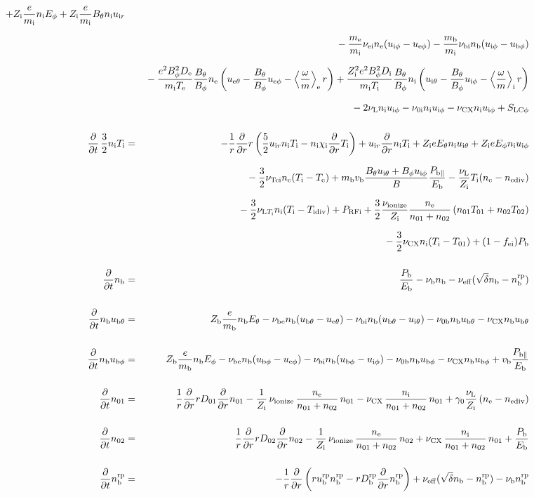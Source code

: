 \documentclass[11pt]{article}
\def\r#1{{\rm#1}}
\def\ddt{\frac{\partial}{\partial t}}
\def\ddr{\frac{\partial}{\partial r}}
\def\ave#1{\left\langle#1\right\rangle}
\def\me{m_\r{e}}
\def\mi{m_\r{i}}
\def\mb{m_\r{b}}
\def\De{D_\r{e}}
\def\Di{D_\r{i}}
\def\chii{\chi_\r{i}}
\def\ne{n_\r{e}}
\def\ni{n_\r{i}}
\def\nb{n_\r{b}}
\def\uir{u_{\r{i}r}}
\def\ueth{u_{\r{e}\theta}}
\def\uith{u_{\r{i}\theta}}
\def\ubth{u_{\r{b}\theta}}
\def\ueph{u_{\r{e}\phi}}
\def\uiph{u_{\r{i}\phi}}
\def\ubph{u_{\r{b}\phi}}
\def\Eth{E_\theta}
\def\Eph{E_\phi}
\def\Bth{B_\theta}
\def\Bph{B_\phi}
\def\Te{T_\r{e}}
\def\Ti{T_\r{i}}
\def\nna{n_{01}}
\def\nnb{n_{02}}
\def\Zi{Z_\r{i}}
\def\Zb{Z_\r{b}}
\def\Pb{P_\r{b}}
\def\Eb{E_\r{b}}
\def\PRFi{P_\r{RFi}}
\def\Tna{T_{01}}
\def\Tnb{T_{02}}
\def\fei{f_\r{ei}}
\def\nbrp{n_\r{b}^\r{rp}}
\def\Pbpara{P_{\r{b}\parallel}}
\def\nueff{\nu_\r{eff}}
\def\ubrp{u_\r{b}^\r{rp}}
\def\Dbrp{D_\r{b}^\r{rp}}
\def\nuNCi{\nu_\r{NCi}}
\def\nuei{\nu_\r{ei}}
\def\nube{\nu_\r{be}}
\def\nubi{\nu_\r{bi}}
\def\nuni{\nu_\r{0i}}
\def\nunb{\nu_\r{0b}}
\def\nuL{\nu_\r{L}}
\def\nuCX{\nu_\r{CX}}
\def\nuion{\nu_\r{ionize}}
\def\nub{\nu_\r{b}}
\def\nuTei{\nu_\r{Tei}}
\def\vb{v_\r{b}}
\def\nediv{n_\r{ediv}}
\def\Tidiv{T_\r{idiv}}
\def\nuLTi{\nu_{\r{L}T_\r{i}}}
\begin{document}
\begin{eqnarray}
%
  + \Zi \frac{e}{\mi} \ni \Eph
%
  + \Zi \frac{e}{\mi} \Bth \ni \uir 
\nonumber\\[2.5mm]&&{}
%
  - \frac{\me}{\mi} \nuei \ne (\uiph - \ueph)
%
  - \frac{\mb}{\mi} \nubi \nb (\uiph - \ubph)
\nonumber\\[2.5mm]&&{}
%
  - \frac{e^2 \Bph^2 \De}{\mi\Te}\frac{\Bth}{\Bph}\ne
    \left(\ueth - \frac{\Bth}{\Bph}\ueph - \ave{\frac{\omega}{m}}_\r{e}
     r \right)
%
  + \frac{\Zi^2 e^2 \Bph^2 \Di}{\mi\Ti}\frac{\Bth}{\Bph}\ni
    \left(\uith - \frac{\Bth}{\Bph}\uiph - \ave{\frac{\omega}{m}}_\r{i}
     r \right)
\nonumber\\[2.5mm]&&{}
%
  - 2 \nuL \ni \uiph
%
  - \nuni \ni \uiph
%
  - \nuCX \ni \uiph
%
  + S_\r{LC\phi}
%
%
\\[5mm]
%
%
  \ddt \, \frac{3}{2} \ni \Ti &=&
%
 - \frac{1}{r} \ddr r
   \left( \frac{5}{2} \uir \ni \Ti - \ni \chii \ddr \Ti \right)
%
  + \uir \ddr \ni \Ti
%
  + \Zi e \Eth \ni \uith
%
  + \Zi e \Eph \ni \uiph
\nonumber\\[2.5mm]&&{}
%
  - \frac{3}{2} \nuTei \ne (\Ti - \Te)
%
  + \mb \vb \frac{\Bth \uith + \Bph \uiph}{B} \frac{\Pbpara}{\Eb}
%
  - \frac{\nuL}{\Zi} \Ti (\ne - \nediv)
\nonumber\\[2.5mm]&&{}
%
  - \frac{3}{2} \nuLTi \ni (\Ti - \Tidiv)
%
  + \PRFi
%
  + \frac{3}{2} \frac{\nuion}{\Zi} \frac{\ne}{\nna +\nnb}\, (\nna \Tna +
  \nnb \Tnb)
\nonumber\\[2.5mm]&&{}
%
  - \frac{3}{2} \nuCX \ni (\Ti - \Tna)
%
  + (1 - \fei) \Pb
\\[5mm]
%
%
  \ddt \nb &=&
%
    \frac{\Pb}{\Eb}
%
  - \nub \nb
%
  - \nueff (\sqrt{\delta}\nb - \nbrp)
\\[5mm]
%
%
  \ddt \nb \ubth &=&
%
    \Zb \frac{e}{\mb} \nb \Eth
%
%
  - \nube \nb (\ubth - \ueth)
%
  - \nubi \nb (\ubth - \uith)
%
  - \nunb \nb \ubth
%
  - \nuCX \nb \ubth
\\[5mm]
%
%
  \ddt \nb \ubph &=&
%
  \Zb \frac{e}{\mb} \nb \Eph
%
  - \nube \nb (\ubph - \ueph)
%
  - \nubi \nb (\ubph - \uiph)
%
  - \nunb \nb \ubph
%
  - \nuCX \nb \ubph
%
  + \vb \frac{\Pbpara}{\Eb}
\\[5mm]
%
%
  \ddt \nna &=& 
%
    \frac{1}{r} \ddr r D_{01} \ddr \nna
%
  - \frac{1}{\Zi}\, \nuion\, \frac{\ne}{\nna+\nnb}\, \nna
%
  - \nuCX\, \frac{\ni}{\nna+\nnb}\, \nna
%
  + \gamma_0 \frac{\nuL}{\Zi} \, (\ne - \nediv)
\\[5mm]
%
%
  \ddt \nnb &=& 
%
    \frac{1}{r} \ddr r D_{02} \ddr \nnb
%
  - \frac{1}{\Zi}\, \nuion\, \frac{\ne}{\nna+\nnb}\, \nnb
%
  + \nuCX\, \frac{\ni}{\nna+\nnb}\, \nna
%
  + \frac{\Pb}{\Eb}
\\[5mm]
%
%
  \ddt \nbrp &=&
%
  - \frac{1}{r} \ddr \left( r \ubrp \nbrp - r \Dbrp \ddr \nbrp \right)
%
  + \nueff (\sqrt{\delta} \nb - \nbrp)
%
  - \nub \nbrp
%
\end{eqnarray}
\end{document}
